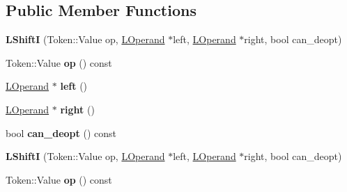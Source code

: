 \subsection*{Public Member Functions}
\begin{DoxyCompactItemize}
\item 
{\bfseries L\+ShiftI} (Token\+::\+Value op, \hyperlink{classv8_1_1internal_1_1_l_operand}{L\+Operand} $\ast$left, \hyperlink{classv8_1_1internal_1_1_l_operand}{L\+Operand} $\ast$right, bool can\+\_\+deopt)\hypertarget{classv8_1_1internal_1_1_l_shift_i_adaac229c54d2a924ac68d595fc30703a}{}\label{classv8_1_1internal_1_1_l_shift_i_adaac229c54d2a924ac68d595fc30703a}

\item 
Token\+::\+Value {\bfseries op} () const \hypertarget{classv8_1_1internal_1_1_l_shift_i_af3e3cecd04a31cf7df5a66653f6c009d}{}\label{classv8_1_1internal_1_1_l_shift_i_af3e3cecd04a31cf7df5a66653f6c009d}

\item 
\hyperlink{classv8_1_1internal_1_1_l_operand}{L\+Operand} $\ast$ {\bfseries left} ()\hypertarget{classv8_1_1internal_1_1_l_shift_i_a5ef728d134ab0ae5565b90793364add0}{}\label{classv8_1_1internal_1_1_l_shift_i_a5ef728d134ab0ae5565b90793364add0}

\item 
\hyperlink{classv8_1_1internal_1_1_l_operand}{L\+Operand} $\ast$ {\bfseries right} ()\hypertarget{classv8_1_1internal_1_1_l_shift_i_a728880e17b20375b612e631dcc13dc3e}{}\label{classv8_1_1internal_1_1_l_shift_i_a728880e17b20375b612e631dcc13dc3e}

\item 
bool {\bfseries can\+\_\+deopt} () const \hypertarget{classv8_1_1internal_1_1_l_shift_i_abbbf228b7c1516e1e419ef9ffbcc97b6}{}\label{classv8_1_1internal_1_1_l_shift_i_abbbf228b7c1516e1e419ef9ffbcc97b6}

\item 
{\bfseries L\+ShiftI} (Token\+::\+Value op, \hyperlink{classv8_1_1internal_1_1_l_operand}{L\+Operand} $\ast$left, \hyperlink{classv8_1_1internal_1_1_l_operand}{L\+Operand} $\ast$right, bool can\+\_\+deopt)\hypertarget{classv8_1_1internal_1_1_l_shift_i_adaac229c54d2a924ac68d595fc30703a}{}\label{classv8_1_1internal_1_1_l_shift_i_adaac229c54d2a924ac68d595fc30703a}

\item 
Token\+::\+Value {\bfseries op} () const \hypertarget{classv8_1_1internal_1_1_l_shift_i_af3e3cecd04a31cf7df5a66653f6c009d}{}\label{classv8_1_1internal_1_1_l_shift_i_af3e3cecd04a31cf7df5a66653f6c009d}


\end{DoxyCompactItemize}
